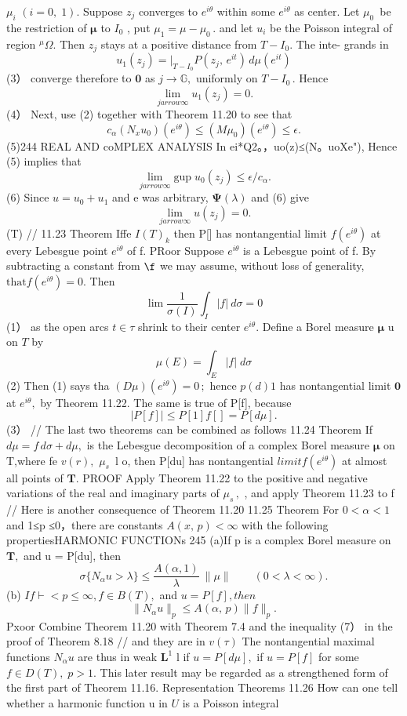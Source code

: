$\mu_{i}$ $(i=0,\;1).$ Suppose $z_{j}$ converges to $e^{i\theta}$ within some $e^{i\theta}$ as center. Let $\mu_{0}\,$ be the restriction of ${\boldsymbol{\mu}}$ to $I_{\mathrm{0}}$ , put $\mu_{1}=\mu-\mu_{0}\,.$ and let $u_{i}$ be the Poisson integral of region $\scriptstyle{}^{\mu}\!\Omega.$ Then $z_{j}$ stays at a positive distance from $T-I_{0}.$ The inte- grands in $$ u_{1}(z_{j})=\left.\right|_{T-I_{0}}P(z_{j},\,e^{i t})\,d\mu(e^{i t}) $$ (3） converge therefore to $\mathbf{0}$ as $j\to\mathbb{G},$ uniformly on $T-I_{0}\,.$ Hence $$ \operatorname*{lim}_{j arrow\infty}u_{1}(z_{j})=0. $$ (4） Next, use (2) together with Theorem 11.20 to see that $$ c_{\alpha}(N_{x}u_{0})(e^{i\theta})\leq(M\mu_{0})(e^{i\theta})\leq\epsilon. $$ (5)244 REAL AND coMPLEX ANALYSIS In ei*Q2。，uo(z)≤(N。uoXe"), Hence (5) implies that $$ \operatorname*{lim}_{j arrow\infty}\mathrm{gup}\;u_{0}(z_{j})\leq\epsilon/c_{\alpha}. $$ (6) Since $u=u_{0}+u_{1}$ and e was arbitrary, $\mathbf{\Psi}(\lambda)$ and (6) give $$ \operatorname*{lim}_{j arrow\infty}u(z_{j})=0. $$ (T) // 11.23 Theorem Iffe $\scriptstyle{I(T)_{k}}$ then P[] has nontangential limit $f(e^{i\theta})$ at every Lebesgue point $e^{i\theta}$ of f. PRoor Suppose $e^{i\theta}$ is a Lebesgue point of f. By subtracting a constant from $\boldsymbol{\f}$ we may assume, without loss of generality, $\mathrm{that}f(e^{i\theta})=0.$ Then $$ \operatorname*{lim}{\frac{1}{\sigma(I)}}\int_{I}|f|\ d\sigma=0 $$ (1） as the open arcs $\scriptstyle{t\in{\tau}}$ shrink to their center $e^{i\theta}.$ Define a Borel measure $\boldsymbol{\mu}$ u on ${\mathbf{}}T$ by $$ \mu(E)=\int_{E}|f|\;d\sigma $$ (2) Then (1) says tha $(D\mu)(e^{i\theta})=0\,;$ hence $\scriptstyle{p(d)1}$ has nontangential limit $\mathbf{0}$ at $e^{i\theta},$ by Theorem 11.22. The same is true of P[f], because $$ |P[f]|\leq P[1]f[]=P[d\mu]. $$ (3） // The last two theorems can be combined as follows 11.24 Theorem If $d\mu=f\,d\sigma+d\mu,$ is the Lebesgue decomposition of a complex Borel measure ${\boldsymbol{\mu}}$ on T,where fe $v(r),$ $\mu_{s}\,$ l o, then P[du] has nontangential $l i m i t f(e^{i\theta})$ at almost all points of ${\boldsymbol{T}}.$ PROOF Apply Theorem 11.22 to the positive and negative variations of the real and imaginary parts of $\mu_{s}\,,$ , and apply Theorem 11.23 to f // Here is another consequence of Theorem 11.20 11.25 Theorem For $0<\alpha<1$ and 1≤p ≤0，there are constants $A(x,\,p)<\infty$ with the following propertiesHARMONIC FUNCTIONs 245 (a)If p is a complex Borel measure on ${\boldsymbol{T}},$ and u = P[du], then $$ \sigma\{N_{\alpha}u>\lambda\}\leq\frac{A(\alpha,1)}{\lambda}\ \|\mu\|\qquad(0<\lambda<\infty). $$ (b) $I f\vdash<p\leq\infty,f\in B(T),$ and $u=P[f],t h e n$ $$ \|N_{\alpha}u\|_{p}\leq A(\alpha,\,p)\|f\|_{p}. $$ Pxoor Combine Theorem 11.20 with Theorem 7.4 and the inequality (7） in the proof of Theorem 8.18 // and they are in $\scriptstyle v(\tau)$ The nontangential maximal functions $N_{\alpha}u$ are thus in weak ${\boldsymbol{L}}^{1}$ l if $u=P[d\mu],$ if $u=P[f]$ for some $f\in D(T),\;p>1.$ This later result may be regarded as a strengthened form of the first part of Theorem 11.16. Representation Theorems 11.26 How can one tell whether a harmonic function u in $U$ is a Poisson integral 